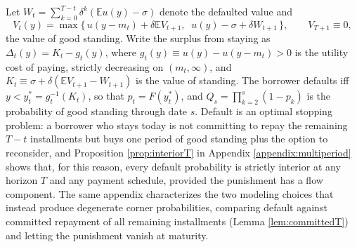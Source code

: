 Let $W_t = \sum_{k=0}^{T-t}\delta^k(\mathbb{E}u(y) - \sigma)$ denote the defaulted value and
\begin{equation}\label{eq:bellmanT}
V_t(y) = \max\big\{\, u(y - m_t) + \delta \mathbb{E}V_{t+1},\;\; u(y) - \sigma + \delta W_{t+1} \,\big\}, \qquad V_{T+1} \equiv 0,
\end{equation}
the value of good standing. Write the surplus from staying as $\Delta_t(y) = K_t - g_t(y)$, where $g_t(y) \equiv u(y) - u(y-m_t) > 0$ is the utility cost of paying, strictly decreasing on $(m_t,\infty)$, and $K_t \equiv \sigma + \delta(\mathbb{E}V_{t+1} - W_{t+1})$ is the value of standing. The borrower defaults iff $y < y_t^* = g_t^{-1}(K_t)$, so that $p_t = F(y_t^*)$, and $Q_s = \prod_{k=2}^{s}(1-p_k)$ is the probability of good standing through date $s$. Default is an optimal stopping problem: a borrower who stays today is not committing to repay the remaining $T-t$ installments but buys one period of good standing plus the option to reconsider, and Proposition \ref{prop:interiorT} in Appendix \ref{appendix:multiperiod} shows that, for this reason, every default probability is strictly interior at any horizon $T$ and any payment schedule, provided the punishment has a flow component. The same appendix characterizes the two modeling choices that instead produce degenerate corner probabilities, comparing default against committed repayment of all remaining installments (Lemma \ref{lem:committedT}) and letting the punishment vanish at maturity.

